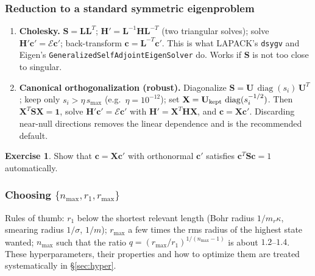 \documentclass[11pt,a4paper]{article}
\numberwithin{equation}{section}
\theoremstyle{definition}
\newtheorem{exercise}[definition]{Exercise}
\theoremstyle{plain}
\theoremstyle{remark}
\numberwithin{algorithm}{section}
\newcommand{\diag}{\operatorname{diag}}
\newcommand{\mr}{m_r}
\newcommand{\mH}{\mathbf H}
\newcommand{\mS}{\mathbf S}
\newcommand{\mX}{\mathbf X}
\newcommand{\vc}{\bm c}
\begin{document}
\subsubsection{Reduction to a standard symmetric eigenproblem}
\begin{enumerate}[leftmargin=1.5em,itemsep=3pt]
\item \textbf{Cholesky.} $\mS=\mathbf L\mathbf L^T$; $\mH'=\mathbf L^{-1}\mH\mathbf L^{-T}$ (two triangular solves); solve $\mH'\vc'=\mathcal E\vc'$; back-transform $\vc=\mathbf L^{-T}\vc'$. This is what LAPACK's \texttt{dsygv} and Eigen's \texttt{GeneralizedSelfAdjoint}\allowbreak\texttt{EigenSolver} do. Works if $\mS$ is not too close to singular.
\item \textbf{Canonical orthogonalization (robust).} Diagonalize $\mS=\mathbf U\,\diag(s_i)\,\mathbf U^T$; keep only $s_i>\eta\,s_{\max}$ (e.g.\ $\eta=10^{-12}$); set $\mX=\mathbf U_{\rm kept}\,\diag(s_i^{-1/2})$. Then $\mX^T\mS\mX=\mathbf 1$, solve $\mH'\vc'=\mathcal E\vc'$ with $\mH'=\mX^T\mH\mX$, and $\vc=\mX\vc'$. Discarding near-null directions removes the linear dependence and is the recommended default.
\end{enumerate}
\begin{exercise}
Show that $\vc=\mX\vc'$ with orthonormal $\vc'$ satisfies $\vc^T\mS\vc=1$ automatically.
\end{exercise}

\subsubsection{\texorpdfstring{Choosing $\{n_{\max},r_1,r_{\max}\}$}{Choosing the basis parameters}}
Rules of thumb: $r_1$ below the shortest relevant length (Bohr radius $1/\mr\kappa$, smearing radius $1/\sigma$, $1/m$); $r_{\max}$ a few times the rms radius of the highest state wanted; $n_{\max}$ such that the ratio $q=(r_{\max}/r_1)^{1/(n_{\max}-1)}$ is about $1.2$--$1.4$. These hyperparameters, their properties and how to optimize them are treated systematically in \S\ref{sec:hyper}.
\end{document}
